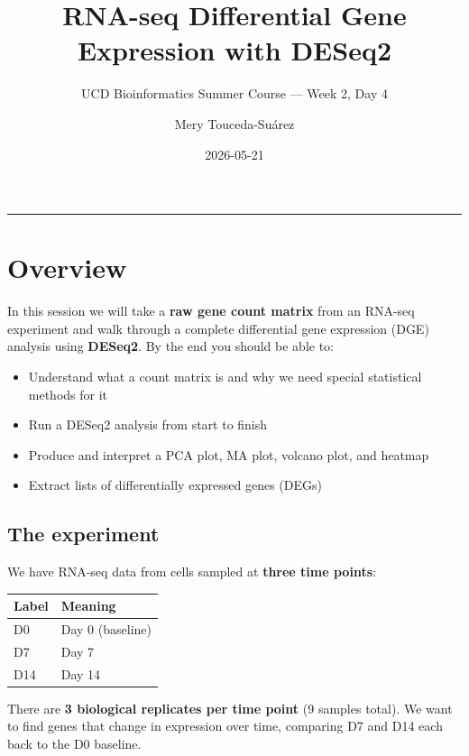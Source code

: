 \documentclass[
]{article}
\title{RNA-seq Differential Gene Expression with DESeq2}
\subtitle{UCD Bioinformatics Summer Course --- Week 2, Day 4}
\author{Mery Touceda-Suárez}
\date{2026-05-21}
\providecommand{\tightlist}{%
  \setlength{\itemsep}{0pt}\setlength{\parskip}{0pt}}
\begin{document}
\maketitle

{
\setcounter{tocdepth}{3}
\tableofcontents
}
\begin{center}\rule{0.5\linewidth}{0.5pt}\end{center}

\section{Overview}\label{overview}

In this session we will take a \textbf{raw gene count matrix} from an
RNA-seq experiment and walk through a complete differential gene
expression (DGE) analysis using \textbf{DESeq2}. By the end you should
be able to:

\begin{itemize}
\tightlist
\item
  Understand what a count matrix is and why we need special statistical
  methods for it
\item
  Run a DESeq2 analysis from start to finish
\item
  Produce and interpret a PCA plot, MA plot, volcano plot, and heatmap
\item
  Extract lists of differentially expressed genes (DEGs)
\end{itemize}

\subsection{The experiment}\label{the-experiment}

We have RNA-seq data from cells sampled at \textbf{three time points}:

\begin{longtable}[]{@{}ll@{}}
\toprule\noalign{}
Label & Meaning \\
\midrule\noalign{}
\endhead
\bottomrule\noalign{}
\endlastfoot
D0 & Day 0 (baseline) \\
D7 & Day 7 \\
D14 & Day 14 \\
\end{longtable}

There are \textbf{3 biological replicates per time point} (9 samples
total). We want to find genes that change in expression over time,
comparing D7 and D14 each back to the D0 baseline.
\end{document}
